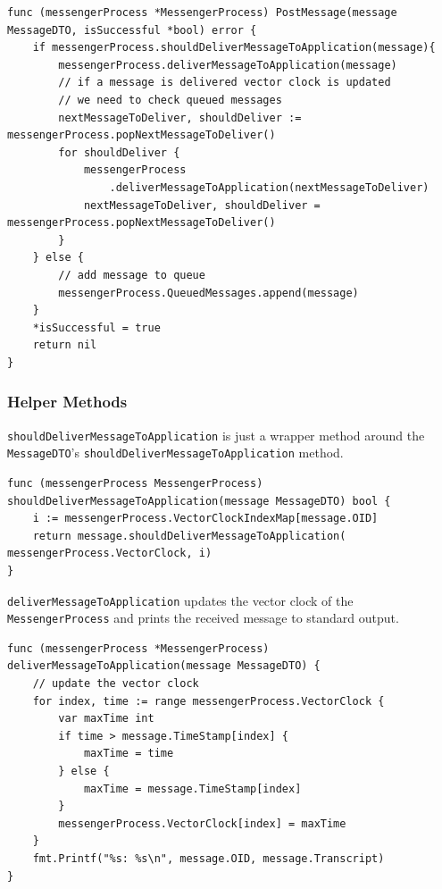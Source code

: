 \documentclass[a4paper]{article}
\begin{document}
\begin{lstlisting}[caption={\texttt{PostMessage} RPC method}, label=PostMessage]
func (messengerProcess *MessengerProcess) PostMessage(message MessageDTO, isSuccessful *bool) error {
    if messengerProcess.shouldDeliverMessageToApplication(message){
        messengerProcess.deliverMessageToApplication(message)
        // if a message is delivered vector clock is updated
        // we need to check queued messages
        nextMessageToDeliver, shouldDeliver := messengerProcess.popNextMessageToDeliver()
        for shouldDeliver {
            messengerProcess
                .deliverMessageToApplication(nextMessageToDeliver)
            nextMessageToDeliver, shouldDeliver = messengerProcess.popNextMessageToDeliver()
        }
    } else {
		// add message to queue
        messengerProcess.QueuedMessages.append(message)
    }
    *isSuccessful = true
    return nil
}
\end{lstlisting}

\newpage

\subsubsection{Helper Methods}

\texttt{shouldDeliverMessageToApplication} is just a wrapper method around the \texttt{MessageDTO}'s \texttt{shouldDeliverMessageToApplication} method.

\begin{lstlisting}[caption={\texttt{shouldDeliverMessageToApplication} helper method}]
func (messengerProcess MessengerProcess) shouldDeliverMessageToApplication(message MessageDTO) bool {
    i := messengerProcess.VectorClockIndexMap[message.OID]
    return message.shouldDeliverMessageToApplication( messengerProcess.VectorClock, i)
}
\end{lstlisting}

\noindent \texttt{deliverMessageToApplication} updates the vector clock of the \texttt{MessengerProcess} and prints the received message to standard output.

\begin{lstlisting}[caption={\texttt{deliverMessageToApplication} helper method}]
func (messengerProcess *MessengerProcess) deliverMessageToApplication(message MessageDTO) {
    // update the vector clock
    for index, time := range messengerProcess.VectorClock {
        var maxTime int
        if time > message.TimeStamp[index] {
            maxTime = time
        } else {
            maxTime = message.TimeStamp[index]
        }
        messengerProcess.VectorClock[index] = maxTime
    }
    fmt.Printf("%s: %s\n", message.OID, message.Transcript)
}
\end{lstlisting}
\end{document}
